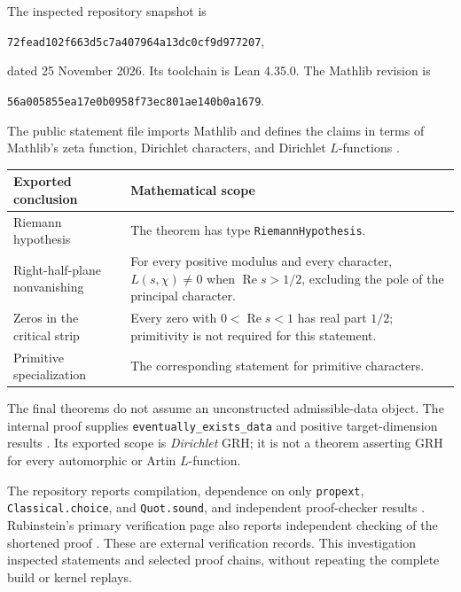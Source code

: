 \documentclass[11pt]{article}
\theoremstyle{definition}
\newcommand{\Repart}{\operatorname{Re}}
\begin{document}
The inspected repository snapshot is
\begin{center}
\texttt{72fead102f663d5c7a407964a13dc0cf9d977207},
\end{center}
dated 25 November 2026. Its toolchain is Lean 4.35.0. The Mathlib revision is
\begin{center}
\texttt{56a005855ea17e0b0958f73ec801ae140b0a1679}.
\end{center}
The public statement file imports Mathlib and defines the claims in terms of
Mathlib's zeta function, Dirichlet characters, and Dirichlet $L$-functions
\cite{statements,mainlean}.

\begin{center}
\begin{tabularx}{\textwidth}{@{}>{\raggedright\arraybackslash}p{}>{\raggedright\arraybackslash}X@{}}
\toprule
Exported conclusion & Mathematical scope \\
\midrule
Riemann hypothesis & The theorem has type \texttt{RiemannHypothesis}. \\
Right-half-plane nonvanishing & For every positive modulus and every character,
$L(s,\chi)\neq0$ when $\Repart s>1/2$, excluding the pole of the principal character. \\
Zeros in the critical strip & Every zero with $0<\Repart s<1$ has real part $1/2$;
primitivity is not required for this statement. \\
Primitive specialization & The corresponding statement for primitive characters. \\
\bottomrule
\end{tabularx}
\end{center}

The final theorems do not assume an unconstructed admissible-data object.
The internal proof supplies \texttt{eventually\_exists\_data} and positive
target-dimension results \cite{existence,shortenough}. Its exported scope is
\emph{Dirichlet} GRH; it is not a theorem asserting GRH for every automorphic
or Artin $L$-function.

The repository reports compilation, dependence on only
\texttt{propext}, \texttt{Classical.choice}, and \texttt{Quot.sound}, and
independent proof-checker results \cite{readme}. Rubinstein's primary
verification page also reports independent checking of the shortened proof
\cite{rubinstein}. These are external verification records. This investigation
inspected statements and selected proof chains, without repeating the complete
build or kernel replays.
\end{document}
